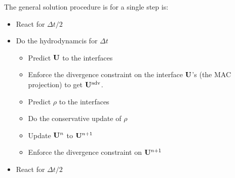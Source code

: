 The general solution procedure is for a single step is:
\begin{itemize}

  \item React for $\Delta t/2$

  \item Do the hydrodynamcis for $\Delta t$

    \begin{itemize}
    \item Predict ${\bf U}$ to the interfaces 
    \item Enforce the divergence constraint on the interface ${\bf U}$'s (the
      MAC projection) to get ${\bf U}^\mathrm{adv}$.
    \item Predict $\rho$ to the interfaces
    \item Do the conservative update of $\rho$
    \item Update ${\bf U}^n$ to ${\bf U}^{n+1}$
    \item Enforce the divergence constraint on ${\bf U}^{n+1}$
    \end{itemize}

  \item React for $\Delta t/2$

\end{itemize}
